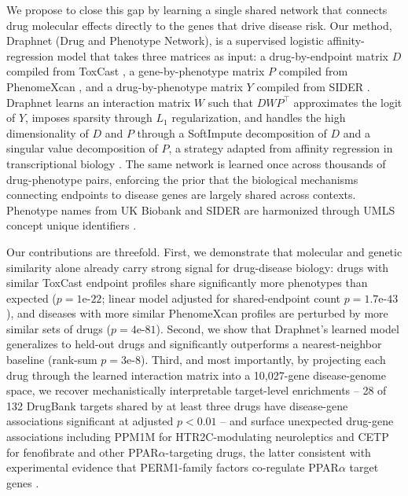 We propose to close this gap by learning a single shared network that
connects drug molecular effects directly to the genes that drive disease
risk. Our method, Draphnet (Drug and Phenotype Network), is a supervised
logistic affinity-regression model that takes three matrices as input: a
drug-by-endpoint matrix $D$ compiled from ToxCast \cite{richard2016toxcast},
a gene-by-phenotype matrix $P$ compiled from PhenomeXcan
\cite{pividori2020phenomexcan,barbeira2019smultixcan}, and a drug-by-phenotype
matrix $Y$ compiled from SIDER \cite{kuhn2016sider}. Draphnet learns an
interaction matrix $W$ such that $DWP^{\top}$ approximates the logit of $Y$,
imposes sparsity through $L_1$ regularization, and handles the high
dimensionality of $D$ and $P$ through a SoftImpute decomposition of $D$
\cite{mazumder2010softimpute} and a singular value decomposition of $P$, a
strategy adapted from affinity regression in transcriptional
biology \cite{osmanbeyoglu2014affinity}. The same network is learned once
across thousands of drug-phenotype pairs, enforcing the prior that the
biological mechanisms connecting endpoints to disease genes are largely
shared across contexts. Phenotype names from UK Biobank and SIDER are
harmonized through UMLS concept unique identifiers \cite{bodenreider2004umls}.

Our contributions are threefold. First, we demonstrate that molecular and
genetic similarity alone already carry strong signal for drug-disease
biology: drugs with similar ToxCast endpoint profiles share significantly
more phenotypes than expected ($p=1\text{e-}22$; linear model adjusted for
shared-endpoint count $p=1.7\text{e-}43$), and diseases with more similar
PhenomeXcan profiles are perturbed by more similar sets of drugs
($p=4\text{e-}81$). Second, we show that Draphnet's learned model generalizes
to held-out drugs and significantly outperforms a nearest-neighbor baseline
(rank-sum $p=3\text{e-}8$). Third, and most importantly, by projecting each
drug through the learned interaction matrix into a 10,027-gene disease-genome
space, we recover mechanistically interpretable target-level enrichments --
28 of 132 DrugBank targets shared by at least three drugs have disease-gene
associations significant at adjusted $p<0.01$ -- and surface unexpected
drug-gene associations including PPM1M for HTR2C-modulating neuroleptics
and CETP for fenofibrate and other PPAR$\alpha$-targeting drugs, the latter
consistent with experimental evidence that PERM1-family factors
co-regulate PPAR$\alpha$ target genes \cite{huang2022perm1}.

